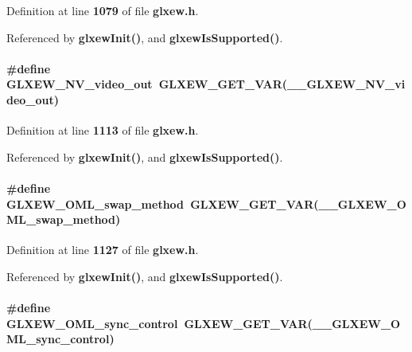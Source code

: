 Definition at line {\bf 1079} of file {\bf glxew.\+h}.



Referenced by {\bf glxew\+Init()}, and {\bf glxew\+Is\+Supported()}.

\paragraph[{G\+L\+X\+E\+W\+\_\+\+N\+V\+\_\+video\+\_\+out}]{\setlength{\rightskip}{0pt plus 5cm}\#define G\+L\+X\+E\+W\+\_\+\+N\+V\+\_\+video\+\_\+out~{\bf G\+L\+X\+E\+W\+\_\+\+G\+E\+T\+\_\+\+V\+AR}({\bf \+\_\+\+\_\+\+G\+L\+X\+E\+W\+\_\+\+N\+V\+\_\+video\+\_\+out})}\label{glxew_8h_a86a24a31abefbb527a07cf847c48b860}


Definition at line {\bf 1113} of file {\bf glxew.\+h}.



Referenced by {\bf glxew\+Init()}, and {\bf glxew\+Is\+Supported()}.

\paragraph[{G\+L\+X\+E\+W\+\_\+\+O\+M\+L\+\_\+swap\+\_\+method}]{\setlength{\rightskip}{0pt plus 5cm}\#define G\+L\+X\+E\+W\+\_\+\+O\+M\+L\+\_\+swap\+\_\+method~{\bf G\+L\+X\+E\+W\+\_\+\+G\+E\+T\+\_\+\+V\+AR}({\bf \+\_\+\+\_\+\+G\+L\+X\+E\+W\+\_\+\+O\+M\+L\+\_\+swap\+\_\+method})}\label{glxew_8h_aa2d442f37c6075040f7a24050417ea18}


Definition at line {\bf 1127} of file {\bf glxew.\+h}.



Referenced by {\bf glxew\+Init()}, and {\bf glxew\+Is\+Supported()}.

\paragraph[{G\+L\+X\+E\+W\+\_\+\+O\+M\+L\+\_\+sync\+\_\+control}]{\setlength{\rightskip}{0pt plus 5cm}\#define G\+L\+X\+E\+W\+\_\+\+O\+M\+L\+\_\+sync\+\_\+control~{\bf G\+L\+X\+E\+W\+\_\+\+G\+E\+T\+\_\+\+V\+AR}({\bf \+\_\+\+\_\+\+G\+L\+X\+E\+W\+\_\+\+O\+M\+L\+\_\+sync\+\_\+control})}\label{glxew_8h_af8ced48d2be7f373cc21b9ee0fde661d}


